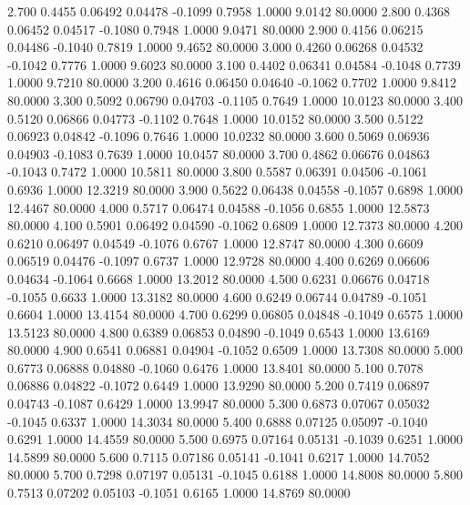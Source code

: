    2.700   0.4455   0.06492   0.04478  -0.1099   0.7958   1.0000   9.0142  80.0000
   2.800   0.4368   0.06452   0.04517  -0.1080   0.7948   1.0000   9.0471  80.0000
   2.900   0.4156   0.06215   0.04486  -0.1040   0.7819   1.0000   9.4652  80.0000
   3.000   0.4260   0.06268   0.04532  -0.1042   0.7776   1.0000   9.6023  80.0000
   3.100   0.4402   0.06341   0.04584  -0.1048   0.7739   1.0000   9.7210  80.0000
   3.200   0.4616   0.06450   0.04640  -0.1062   0.7702   1.0000   9.8412  80.0000
   3.300   0.5092   0.06790   0.04703  -0.1105   0.7649   1.0000  10.0123  80.0000
   3.400   0.5120   0.06866   0.04773  -0.1102   0.7648   1.0000  10.0152  80.0000
   3.500   0.5122   0.06923   0.04842  -0.1096   0.7646   1.0000  10.0232  80.0000
   3.600   0.5069   0.06936   0.04903  -0.1083   0.7639   1.0000  10.0457  80.0000
   3.700   0.4862   0.06676   0.04863  -0.1043   0.7472   1.0000  10.5811  80.0000
   3.800   0.5587   0.06391   0.04506  -0.1061   0.6936   1.0000  12.3219  80.0000
   3.900   0.5622   0.06438   0.04558  -0.1057   0.6898   1.0000  12.4467  80.0000
   4.000   0.5717   0.06474   0.04588  -0.1056   0.6855   1.0000  12.5873  80.0000
   4.100   0.5901   0.06492   0.04590  -0.1062   0.6809   1.0000  12.7373  80.0000
   4.200   0.6210   0.06497   0.04549  -0.1076   0.6767   1.0000  12.8747  80.0000
   4.300   0.6609   0.06519   0.04476  -0.1097   0.6737   1.0000  12.9728  80.0000
   4.400   0.6269   0.06606   0.04634  -0.1064   0.6668   1.0000  13.2012  80.0000
   4.500   0.6231   0.06676   0.04718  -0.1055   0.6633   1.0000  13.3182  80.0000
   4.600   0.6249   0.06744   0.04789  -0.1051   0.6604   1.0000  13.4154  80.0000
   4.700   0.6299   0.06805   0.04848  -0.1049   0.6575   1.0000  13.5123  80.0000
   4.800   0.6389   0.06853   0.04890  -0.1049   0.6543   1.0000  13.6169  80.0000
   4.900   0.6541   0.06881   0.04904  -0.1052   0.6509   1.0000  13.7308  80.0000
   5.000   0.6773   0.06888   0.04880  -0.1060   0.6476   1.0000  13.8401  80.0000
   5.100   0.7078   0.06886   0.04822  -0.1072   0.6449   1.0000  13.9290  80.0000
   5.200   0.7419   0.06897   0.04743  -0.1087   0.6429   1.0000  13.9947  80.0000
   5.300   0.6873   0.07067   0.05032  -0.1045   0.6337   1.0000  14.3034  80.0000
   5.400   0.6888   0.07125   0.05097  -0.1040   0.6291   1.0000  14.4559  80.0000
   5.500   0.6975   0.07164   0.05131  -0.1039   0.6251   1.0000  14.5899  80.0000
   5.600   0.7115   0.07186   0.05141  -0.1041   0.6217   1.0000  14.7052  80.0000
   5.700   0.7298   0.07197   0.05131  -0.1045   0.6188   1.0000  14.8008  80.0000
   5.800   0.7513   0.07202   0.05103  -0.1051   0.6165   1.0000  14.8769  80.0000
